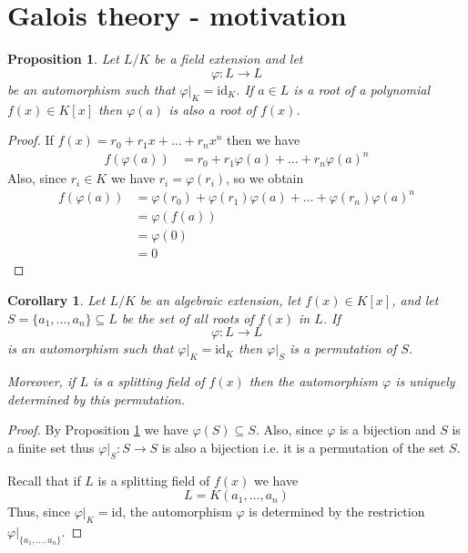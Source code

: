 \documentclass[12pt, letterpaper, oneside]{article}
\theoremstyle{plain}
\newtheorem{proposition}[theorem]{Proposition}
\newtheorem{corollary}[theorem]{Corollary}
\theoremstyle{definition}
\newcommand{\id}{\mathrm{id}}
\newcommand{\vs}{\vskip 5mm}
\begin{document}


\newpage
\section{Galois theory - motivation}
\label{SEC_GALOISMOTIVATION}


\begin{proposition}
\label{PROP_AUTOOFROOTS}
Let $L/K$ be a field extension and let 
$$\varphi\colon L \to L$$
be  an automorphism such that $\varphi|_{K} = \id_{K}$. If $a\in L$ is a root 
of a polynomial $f(x)\in K[x]$ then  $\varphi(a)$ is also a root of $f(x)$. 
\end{proposition}


\vs

\begin{proof}
If $f(x) = r_{0} + r_{1}x + {\dots} + r_{n}x^{n}$ then we have 
\begin{align*}
f(\varphi(a)) & =  r_{0} + r_{1}\varphi(a) + {\dots} + r_{n}\varphi(a)^{n}
\end{align*}
Also, since  $r_{i}\in K$ we have $r_{i} = \varphi(r_{i})$, so we obtain
\begin{align*}
f(\varphi(a)) & =  \varphi(r_{0}) + \varphi(r_{1})\varphi(a) + {\dots} + \varphi(r_{n})\varphi(a)^{n} \\
& = \varphi(f(a))  \\
& = \varphi(0) \\
& = 0
\end{align*}
\end{proof}

\vs\vs



\begin{corollary}
\label{COR_ATOROOTSPERMUT}
Let $L/K$ be an algebraic extension, let $f(x)\in K[x]$,  
and let $S= \{a_{1}, \dots, a_{n} \}\subseteq L$ be the set of all roots of $f(x)$ in $L$. 
If 
$$\varphi\colon L \to L$$ 
is an automorphism such that $\varphi|_{K} = \id_{K}$
then $\varphi|_S$ is a permutation of  $S$. 

Moreover, if $L$ is a splitting field of $f(x)$ then the automorphism $\varphi$ 
is uniquely determined by this permutation. 
\end{corollary}


\vs


\begin{proof}
By Proposition \ref{PROP_AUTOOFROOTS} we have $\varphi(S)\subseteq S$. 
Also, since $\varphi$ is a bijection and $S$ is a finite set thus 
$\varphi|_{S}\colon S \to S$ is also a bijection i.e. it is a permutation of the set $S$. 

Recall that if  $L$ is a splitting field of $f(x)$ we have 
$$L = K( a_{1}, \dots, a_{n})$$
Thus, since $\varphi|_{K} = \id$, the automorphism $\varphi$ is determined by 
the restriction $\varphi|_{\{a_{1}, \dots, a_{n}\}}$.
\end{proof}
\end{document}
